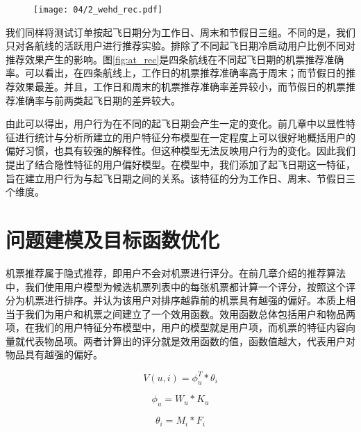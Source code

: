 \begin{figure}
 \centering
 \texttt{[image: 04/2\_wehd\_rec.pdf]}
\end{figure}

我们同样将测试订单按起飞日期分为工作日、周末和节假日三组。不同的是，我们只对各航线的活跃用户进行推荐实验。排除了不同起飞日期冷启动用户比例不同对推荐效果产生的影响。图\ref{fig:at_rec}是四条航线在不同起飞日期的机票推荐准确率。可以看出，在四条航线上，工作日的机票推荐准确率高于周末；而节假日的推荐效果最差。并且，工作日和周末的机票推荐准确率差异较小，而节假日的机票推荐准确率与前两类起飞日期的差异较大。

由此可以得出，用户行为在不同的起飞日期会产生一定的变化。前几章中以显性特征进行统计与分析所建立的用户特征分布模型在一定程度上可以很好地概括用户的偏好习惯，也具有较强的解释性。但这种模型无法反映用户行为的变化。因此我们提出了结合隐性特征的用户偏好模型。在模型中，我们添加了起飞日期这一特征，旨在建立用户行为与起飞日期之间的关系。该特征的分为工作日、周末、节假日三个维度。

\section{问题建模及目标函数优化}

机票推荐属于隐式推荐，即用户不会对机票进行评分。在前几章介绍的推荐算法中，我们使用用户模型为候选机票列表中的每张机票都计算一个评分，按照这个评分为机票进行排序。并认为该用户对排序越靠前的机票具有越强的偏好。本质上相当于我们为用户和机票之间建立了一个效用函数。效用函数总体包括用户和物品两项，在我们的用户特征分布模型中，用户的模型就是用户项，而机票的特征内容向量就代表物品项。两者计算出的评分就是效用函数的值，函数值越大，代表用户对物品具有越强的偏好。

\begin{equation}
\label{eq:utility}
	V(u,i) = \phi_u^T * \theta_i
\end{equation}

\begin{equation}
\label{eq:phi_u}
	\phi_u = W_u * K_u
\end{equation}

\begin{equation}
\label{eq:theta_i}
	\theta_i = M_i * F_i
\end{equation}

